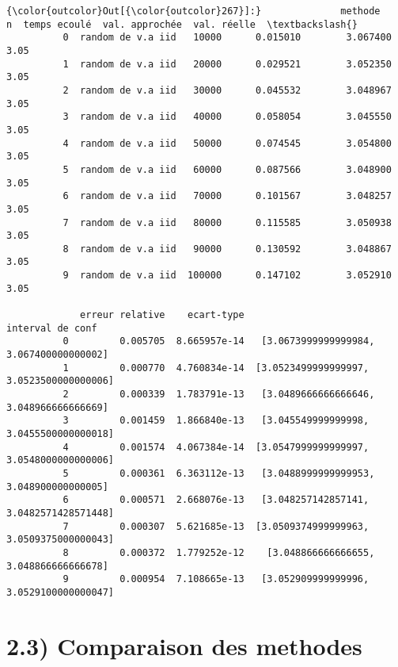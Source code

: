 \documentclass[11pt]{article}
\begin{document}
            \begin{Verbatim}[commandchars=\\\{\}]
{\color{outcolor}Out[{\color{outcolor}267}]:}              methode       n  temps ecoulé  val. approchée  val. réelle  \textbackslash{}
          0  random de v.a iid   10000      0.015010        3.067400         3.05   
          1  random de v.a iid   20000      0.029521        3.052350         3.05   
          2  random de v.a iid   30000      0.045532        3.048967         3.05   
          3  random de v.a iid   40000      0.058054        3.045550         3.05   
          4  random de v.a iid   50000      0.074545        3.054800         3.05   
          5  random de v.a iid   60000      0.087566        3.048900         3.05   
          6  random de v.a iid   70000      0.101567        3.048257         3.05   
          7  random de v.a iid   80000      0.115585        3.050938         3.05   
          8  random de v.a iid   90000      0.130592        3.048867         3.05   
          9  random de v.a iid  100000      0.147102        3.052910         3.05   
          
             erreur relative    ecart-type                          interval de conf  
          0         0.005705  8.665957e-14   [3.0673999999999984, 3.067400000000002]  
          1         0.000770  4.760834e-14  [3.0523499999999997, 3.0523500000000006]  
          2         0.000339  1.783791e-13   [3.0489666666666646, 3.048966666666669]  
          3         0.001459  1.866840e-13   [3.045549999999998, 3.0455500000000018]  
          4         0.001574  4.067384e-14  [3.0547999999999997, 3.0548000000000006]  
          5         0.000361  6.363112e-13   [3.0488999999999953, 3.048900000000005]  
          6         0.000571  2.668076e-13   [3.048257142857141, 3.0482571428571448]  
          7         0.000307  5.621685e-13  [3.0509374999999963, 3.0509375000000043]  
          8         0.000372  1.779252e-12    [3.048866666666655, 3.048866666666678]  
          9         0.000954  7.108665e-13   [3.052909999999996, 3.0529100000000047]  
\end{Verbatim}
        
    \section{2.3) Comparaison des methodes}\label{comparaison-des-methodes}
\end{document}

